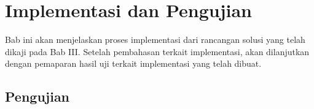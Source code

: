\chapter{Implementasi dan Pengujian}
Bab ini akan menjelaskan proses implementasi dari rancangan solusi yang telah dikaji pada Bab III. Setelah pembahasan terkait implementasi, akan dilanjutkan dengan pemaparan hasil uji terkait implementasi yang telah dibuat.





\section{Pengujian}

